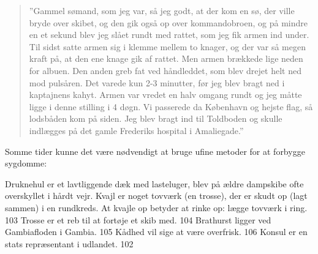 \begin{quote}
    
    ''Gammel sømand, som jeg var, så jeg godt, at der kom en sø, der
    ville bryde over skibet, og den gik også op over kommandobroen, og på
    mindre en et sekund blev jeg slået rundt med rattet, som jeg fik
    armen ind under. Til sidst satte armen sig i klemme mellem to knager,
    og der var så megen kraft på, at den ene knage gik af rattet. Men
    armen brækkede lige neden for albuen.  Den anden greb fat ved
    håndleddet, som blev drejet helt ned mod pulsåren. Det varede kun 2-3
    minutter, før jeg blev bragt ned i kaptajnens kahyt. Armen var vredet
    en halv omgang rundt og jeg måtte ligge i denne stilling i 4 døgn. Vi
    passerede da København og hejste flag, så lodsbåden kom på siden. Jeg
    blev bragt ind til Toldboden og skulle indlægges på det gamle
    Frederiks hospital i Amaliegade.'' 

\end{quote}


Somme tider kunne det være nødvendigt at bruge ufine metoder for at
forbygge sygdomme:

Druknehul er et lavtliggende dæk med lasteluger, blev på ældre dampskibe
ofte overskyllet i hårdt vejr. Kvajl er noget tovværk (en trosse), der
er skudt op (lagt sammen) i en rundkreds. At kvajle op betyder at rinke
op: lægge tovværk i ring. 103 Trosse er et reb til at fortøje et skib
med. 104 Brathurst ligger ved Gambiafloden i Gambia. 105 Kådhed vil sige
at være overfrisk. 106 Konsul er en stats repræsentant i udlandet. 102

